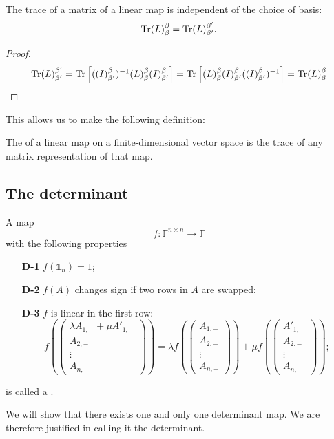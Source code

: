 \begin{proposition}
The trace of a matrix of a linear map is independent of the choice of basis:
\[ \operatorname{Tr}(L)_{\beta}^{\beta} = \operatorname{Tr}(L)_{\beta'}^{\beta'}. \]
\end{proposition}
\begin{proof}
\[ \operatorname{Tr}(L)_{\beta'}^{\beta'} = \operatorname{Tr}\left[((I)_{\beta'}^{\beta})^{-1}(L)_\beta^\beta(I)_{\beta'}^{\beta}\right] = \operatorname{Tr}\left[(L)_\beta^\beta(I)_{\beta'}^{\beta}((I)_{\beta'}^{\beta})^{-1}\right] = \operatorname{Tr}(L)_\beta^\beta \]
\end{proof}
This allows us to make the following definition:
\begin{definition}
The  of a linear map on a finite-dimensional vector space is the trace of any matrix representation of that map.
\end{definition}
\subsection{The determinant}
\begin{definition}
A map
\[ f: \mathbb{F}^{n\times n}\to \mathbb{F} \]
with the following properties
\begin{itemize}
\item[\textbf{D-1}] $f(\mathbb{1}_n) = 1$;
\item[\textbf{D-2}] $f(A)$ changes sign if two rows in $A$ are swapped;
\item[\textbf{D-3}] $f$ is linear in the first row:
\[ f(\begin{pmatrix}
\lambda A_{1,-} + \mu A'_{1,-} \\ A_{2,-} \\ \vdots \\ A_{n,-} 
\end{pmatrix}) = \lambda f(\begin{pmatrix}
A_{1,-} \\ A_{2,-} \\ \vdots \\ A_{n,-} 
\end{pmatrix}) + \mu f(\begin{pmatrix}
A'_{1,-} \\ A_{2,-} \\ \vdots \\ A_{n,-} 
\end{pmatrix}); \]
\end{itemize}
is called a .
\end{definition}
We will show that there exists one and only one determinant map. We are therefore justified in calling it the determinant.

